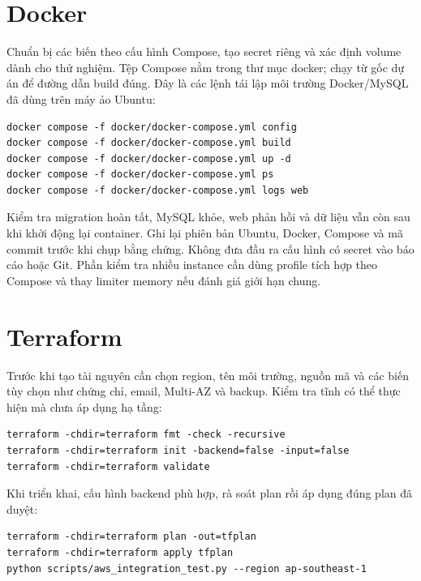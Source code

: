 \section{Docker}
Chuẩn bị các biến theo cấu hình Compose, tạo secret riêng và xác định volume dành cho thử nghiệm. Tệp Compose nằm trong thư mục docker; chạy từ gốc dự án để đường dẫn build đúng. Đây là các lệnh tái lập môi trường Docker/MySQL đã dùng trên máy ảo Ubuntu:
\begin{verbatim}
docker compose -f docker/docker-compose.yml config
docker compose -f docker/docker-compose.yml build
docker compose -f docker/docker-compose.yml up -d
docker compose -f docker/docker-compose.yml ps
docker compose -f docker/docker-compose.yml logs web
\end{verbatim}
Kiểm tra migration hoàn tất, MySQL khỏe, web phản hồi và dữ liệu vẫn còn sau khi khởi động lại container. Ghi lại phiên bản Ubuntu, Docker, Compose và mã commit trước khi chụp bằng chứng. Không đưa đầu ra cấu hình có secret vào báo cáo hoặc Git. Phần kiểm tra nhiều instance cần dùng profile tích hợp theo Compose và thay limiter memory nếu đánh giá giới hạn chung.
\section{Terraform}
Trước khi tạo tài nguyên cần chọn region, tên môi trường, nguồn mã và các biến tùy chọn như chứng chỉ, email, Multi-AZ và backup. Kiểm tra tĩnh có thể thực hiện mà chưa áp dụng hạ tầng:
\begin{verbatim}
terraform -chdir=terraform fmt -check -recursive
terraform -chdir=terraform init -backend=false -input=false
terraform -chdir=terraform validate
\end{verbatim}
Khi triển khai, cấu hình backend phù hợp, rà soát plan rồi áp dụng đúng plan đã duyệt:
\begin{verbatim}
terraform -chdir=terraform plan -out=tfplan
terraform -chdir=terraform apply tfplan
python scripts/aws_integration_test.py --region ap-southeast-1
\end{verbatim}

